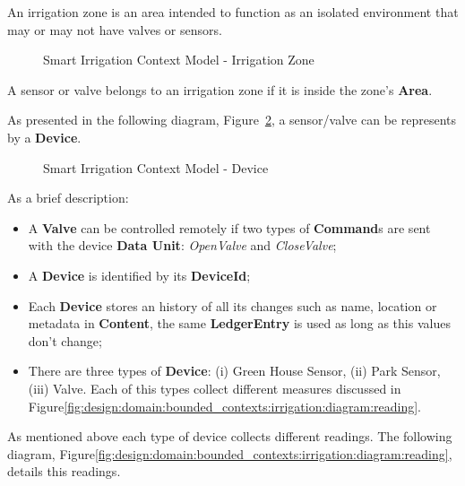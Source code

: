 An irrigation zone is an area intended to function as an isolated environment that may or may not have valves or sensors.

\begin{figure}[H]
   \centering
  \resizebox{\columnwidth}{!}
  {
     
  }
  \caption[Smart Irrigation Context Model - Irrigation Zone]{Smart Irrigation Context Model - Irrigation Zone}
  \label{fig:design:domain:bounded_contexts:irrigation:diagram:garden}
\end{figure}

A sensor or valve belongs to an irrigation zone if it is inside the zone's \textbf{Area}.

As presented in the following diagram, Figure~\ref{fig:design:domain:bounded_contexts:irrigation:diagram:device}, a sensor/valve can be represents by a \textbf{Device}.

\begin{figure}[H]
   \centering
  \resizebox{\columnwidth}{!}
  {
     
  }
  \caption[Smart Irrigation Context Model - Device]{Smart Irrigation Context Model - Device}
  \label{fig:design:domain:bounded_contexts:irrigation:diagram:device}
\end{figure}

As a brief description:

\begin{itemize}
   \item A \textbf{Valve} can be controlled remotely if two types of \textbf{Command}s are sent with the device \textbf{Data Unit}: \textit{OpenValve} and \textit{CloseValve};
   \item A \textbf{Device} is identified by its \textbf{DeviceId};
   \item Each \textbf{Device} stores an history of all its changes such as name, location or metadata in \textbf{Content}, the same \textbf{LedgerEntry} is used as long as this values don't change;
   \item There are three types of \textbf{Device}: (i) Green House Sensor, (ii) Park Sensor, (iii) Valve. Each of this types collect different measures discussed in Figure\ref{fig:design:domain:bounded_contexts:irrigation:diagram:reading}.
\end{itemize}

As mentioned above each type of device collects different readings. The following diagram, Figure\ref{fig:design:domain:bounded_contexts:irrigation:diagram:reading}, details this readings.

